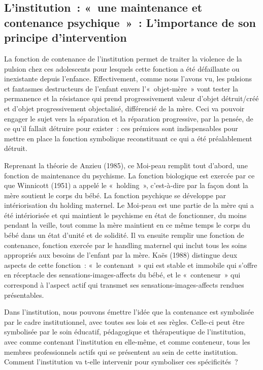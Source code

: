 \documentclass[12pt, a4paper]{book}
\begin{document}
\begin{spacing}{1.5}
\subsection{L'institution : « une maintenance et contenance psychique » : L'importance de son principe d'intervention}

La fonction de contenance de l'institution permet de traiter la violence de la pulsion chez ces adolescents pour lesquels cette fonction a été défaillante ou inexistante depuis l'enfance. Effectivement, comme nous l'avons vu, les pulsions et fantasmes destructeurs de l'enfant envers  l'« objet-mère » vont tester la permanence et la résistance qui prend progressivement valeur d'objet détruit/créé et d'objet progressivement objectalisé, différencié de la mère. Ceci va pouvoir engager le sujet vers la séparation et la réparation progressive, par la pensée, de ce qu'il fallait détruire pour exister : ces prémices sont indispensables pour mettre en place la fonction symbolique reconstituant ce qui a été préalablement détruit.

Reprenant la théorie de Anzieu (1985), ce Moi-peau remplit tout d'abord, une fonction de maintenance du psychisme. La fonction biologique est exercée par ce que Winnicott (1951) a appelé le « holding », c'est-à-dire par la façon dont la mère soutient le corps du bébé. La fonction psychique se développe par intériorisation du holding maternel. Le Moi-peau est une partie de la mère qui a été intériorisée et qui maintient le psychisme en état de fonctionner, du moins pendant la veille, tout comme la mère maintient en ce même temps le corps du bébé dans un état d'unité et de solidité. Il va ensuite remplir une fonction de contenance, fonction exercée par le handling maternel qui inclut tous les soins appropriés aux besoins de l'enfant par la mère. Kaës (1988) distingue deux aspects de cette fonction : « le contenant » qui est stable et immobile qui s'offre en réceptacle des sensations-images-affects du bébé, et le « conteneur » qui correspond à l'aspect actif qui transmet ses sensations-images-affects rendues présentables.

Dans l'institution, nous pouvons émettre l'idée que la contenance est symbolisée par le cadre institutionnel, avec toutes ses lois et ses règles. Celle-ci peut être symbolisée par le soin éducatif, pédagogique et thérapeutique de l'institution, avec comme contenant l'institution en elle-même, et comme conteneur, tous les membres professionnels actifs qui se présentent au sein de cette institution. Comment l'institution va t-elle intervenir pour symboliser ces spécificités ?


\end{spacing}
\end{document}
